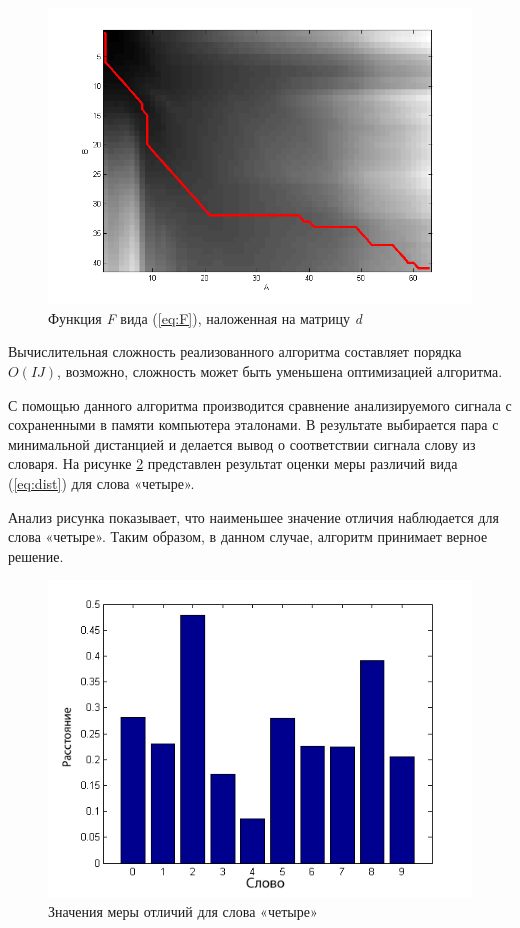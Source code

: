 \documentclass[a4paper,14pt,russian,utf8,nocolumnsxix,nocolumnxxxi,nocolumnxxxii]{eskdtext}
\begin{document}
\begin{figure}[h]	
	\centering
	\includegraphics[width=120mm]{d_matrix.png}			
	\caption{Функция \textit{F} вида (\ref{eq:F}), наложенная на матрицу \textit{d}}
	\label{d_matrix}
\end{figure}

Вычислительная сложность реализованного алгоритма составляет порядка $O(IJ)$, возможно, сложность может быть уменьшена оптимизацией алгоритма.

С помощью данного алгоритма производится сравнение анализируемого сигнала с сохраненными в памяти компьютера эталонами. В результате выбирается пара с минимальной дистанцией и делается вывод о соответствии сигнала слову из словаря. На рисунке \ref{dist_4} представлен результат оценки меры различий вида (\ref{eq:dist}) для слова «четыре».

Анализ рисунка показывает, что наименьшее значение отличия наблюдается для слова «четыре». Таким образом, в данном случае, алгоритм принимает верное решение.

\begin{figure}[H]	
	\centering
	\includegraphics[width=120mm]{dist_4.png}
	\caption{Значения меры отличий для слова «четыре»}
	\label{dist_4}
\end{figure} 
\end{document}
